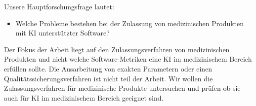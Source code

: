 Unsere Hauptforschungsfrage lautet:
\begin{itemize}
\item Welche Probleme bestehen bei der Zulassung von medizinischen Produkten mit KI unterstützter Software?\end{itemize}
Der Fokus der Arbeit liegt auf den Zulassungsverfahren von medizinischen Produkten und nicht welche Software-Metriken eine KI im medizinischem Bereich erfüllen sollte. Die Ausarbeitung von exakten Parametern oder einen Qualitätssicherungsverfahren ist nicht teil der Arbeit. Wir wollen die Zulassungsverfahren für medizinische Produkte untersuchen und prüfen ob sie auch für KI im medizinischem Bereich geeignet sind.